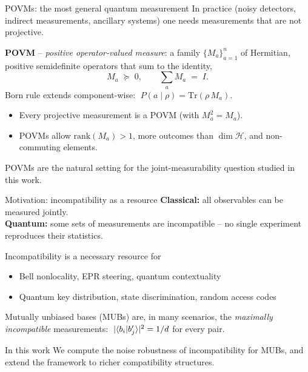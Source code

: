 \documentclass[10pt,aspectratio=169]{beamer}
\begin{document}
\begin{frame}{POVMs: the most general quantum measurement}
  In practice (noisy detectors, indirect measurements, ancillary systems) one needs measurements that are \alert{not projective}.

  \medskip
  \textbf{POVM} -- \emph{positive operator-valued measure}: a family $\{M_{a}\}_{a = 1}^{n}$ of Hermitian, \alert{positive semidefinite} operators that sum to the identity,
  \[
    M_{a} \;\succeq\; 0,
    \qquad \sum_{a} M_{a} \;=\; I.
  \]
  Born rule extends component-wise: $\;P(a \mid \rho) = \mathrm{Tr}(\rho\,M_{a})$.

  \medskip
  \begin{itemize}
    \item Every projective measurement is a POVM (with $M_{a}^{2} = M_{a}$).
    \item POVMs allow $\mathrm{rank}(M_{a}) > 1$, more outcomes than $\dim \mathcal{H}$, and non-commuting elements.
  \end{itemize}

  \medskip
  POVMs are the natural setting for the joint-measurability question studied in this work.
\end{frame}

\begin{frame}{Motivation: incompatibility as a resource}
  \textbf{Classical:} all observables can be measured jointly.\\
  \textbf{Quantum:} some sets of measurements are \alert{incompatible} -- no single experiment reproduces their statistics.

  \medskip
  Incompatibility is a \alert{necessary resource} for
  \begin{itemize}
    \item Bell nonlocality, EPR steering, quantum contextuality
    \item Quantum key distribution, state discrimination, random access codes
  \end{itemize}

  \medskip
  \alert{Mutually unbiased bases (MUBs)} are, in many scenarios, the \emph{maximally incompatible} measurements:
  $\;|\!\braket{b_i | b'_j}\!|^2 = 1/d$ for every pair.

  \medskip
  \begin{block}{In this work}
    We compute the noise robustness of incompatibility for MUBs, and
    extend the framework to \alert{richer compatibility structures}.
  \end{block}
\end{frame}
\end{document}
